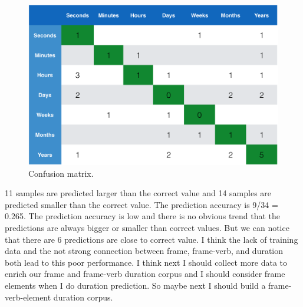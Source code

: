 \documentclass[11pt,a4paper]{article}
\begin{document}
\begin{figure}[H] 
\begin{center} 
\centerline{\includegraphics[width=\columnwidth]{figs/fig8.png}}
\caption{Confusion matrix.}
\label{eighth_fig}
\end{center}
\vskip -0.3in
\end{figure}


11 samples are predicted larger than the correct value and 14 samples are predicted smaller than the correct value. The prediction accuracy is 9/34 = 0.265. The prediction accuracy is low and there is no obvious trend that the predictions are always bigger or smaller than correct values. But we can notice that there are 6 predictions are close to correct value. 
I think the lack of training data and the not strong connection between frame, frame-verb, and duration both lead to this poor performance. I think next I should collect more data to enrich our frame and frame-verb duration corpus and I should consider frame elements when I do duration prediction. So maybe next I should build a frame-verb-element duration corpus.
\end{document}
